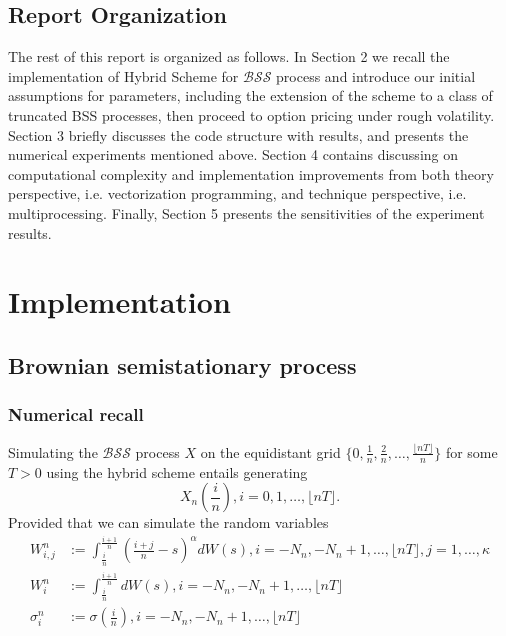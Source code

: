 \documentclass[12pt]{article}
\numberwithin{equation}{section}
\begin{document}
  \subsection{Report Organization}
    
    The rest of this report is organized as follows. In Section 2 we recall the implementation of Hybrid Scheme for $\mathcal{BSS}$ process and introduce our initial assumptions for parameters, including the extension of the scheme to a class of truncated BSS processes, then proceed to option pricing under rough volatility. Section 3 briefly discusses the code structure with results, and presents the numerical experiments mentioned above. Section 4 contains discussing on computational complexity and implementation improvements from both theory perspective, i.e. vectorization programming, and technique perspective, i.e. multiprocessing. Finally, Section 5 presents the sensitivities of the experiment results.

\section{Implementation}
  \subsection{Brownian semistationary process}
      \subsubsection{Numerical recall}
        Simulating the $\mathcal{BSS}$ process $X$ on the equidistant grid $ \{0, \frac{1}{n}, \frac{2}{n}, \dots, \frac{\lfloor nT \rfloor}{n} \} $ for some $T>0$ using the hybrid scheme entails generating
        \begin{equation}
          X_n(\frac{i}{n}), i = 0, 1, \dots, \lfloor nT \rfloor.
        \end{equation}
        Provided that we can simulate the random variables
        \begin{equation}
          \begin{split}
            W_{i,j}^n &:= \int_{\frac{i}{n}}^{\frac{i+1}{n}} (\frac{i+j}{n} - s) ^ \alpha dW(s), i = -N_n, -N_n+1, \dots, \lfloor nT \rfloor, j = 1,\dots,\kappa \\
            W_{i}^n &:= \int_{\frac{i}{n}}^{\frac{i+1}{n}} dW(s), i = -N_n, -N_n+1, \dots, \lfloor nT \rfloor \\
            \sigma_i^n &:= \sigma\left(\frac{i}{n}\right), i = -N_n, -N_n+1, \dots, \lfloor nT \rfloor
          \end{split}
        \end{equation}
\end{document}
